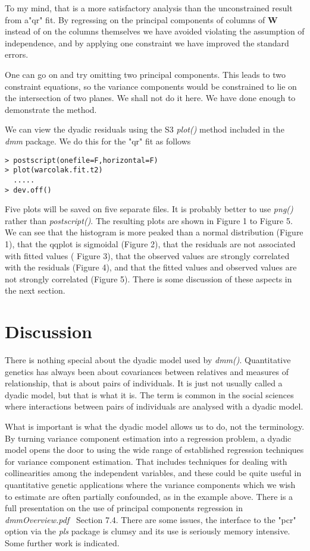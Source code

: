 \documentclass[titlepage]{article}  %
\begin{document}
To my mind, that is a more satisfactory analysis than the unconstrained result from  a"qr" fit. By regressing on the principal components of columns of $\bm{W}$ instead of on the columns themselves we have avoided violating the assumption of independence, and by applying one constraint we have improved the standard errors.

One can go on and try omitting two principal components. This leads to two constraint equations, so the variance components would be constrained to lie on the intersection of two planes. We shall not do it here. We have done enough to demonstrate the method. 

We can view the dyadic residuals using the S3 {\em plot()} method included in the {\em dmm} package. We do this for the "qr" fit as follows

\begin{verbatim}
> postscript(onefile=F,horizontal=F)
> plot(warcolak.fit.t2)
  .....
> dev.off()
\end{verbatim}

Five plots will be saved on five separate files. It is probably better to use {\em png()} rather than {\em postscript()}. The resulting plots are shown in Figure 1 to Figure 5. We can see that the histogram is more peaked than a normal distribution (Figure 1), that the qqplot is sigmoidal (Figure 2), that the residuals are not associated with fitted values ( Figure 3), that the observed values are strongly correlated with the residuals (Figure 4), and that the fitted values and observed values are not strongly correlated (Figure 5). There is some discussion of these aspects in the next section.

%
%
%
%
%

\section{Discussion}
There is nothing special about the dyadic model used by {\em dmm()}. Quantitative genetics has always been about covariances between relatives and measures of relationship, that is about pairs of individuals. It is just not usually called a dyadic model, but that is what it is. The term is common in the social sciences where interactions between pairs of individuals  are analysed with a dyadic model.

What is important is what the dyadic model allows us to do, not the terminology. By turning variance component estimation into a regression problem, a dyadic model opens the door to using the wide range of established regression techniques for variance component estimation. That includes techniques for dealing with collinearities among the independent variables, and these could be quite useful in quantitative genetic applications where the variance components which we wish to estimate are often partially confounded, as in the example above. There is a full presentation on the use of principal components regression in {\em dmmOverview.pdf}~\cite{jack:15} Section 7.4. There are some issues, the interface to the "pcr" option via the {\em pls} package is clumsy and its use is seriously memory intensive. Some further work is indicated.
\end{document}
